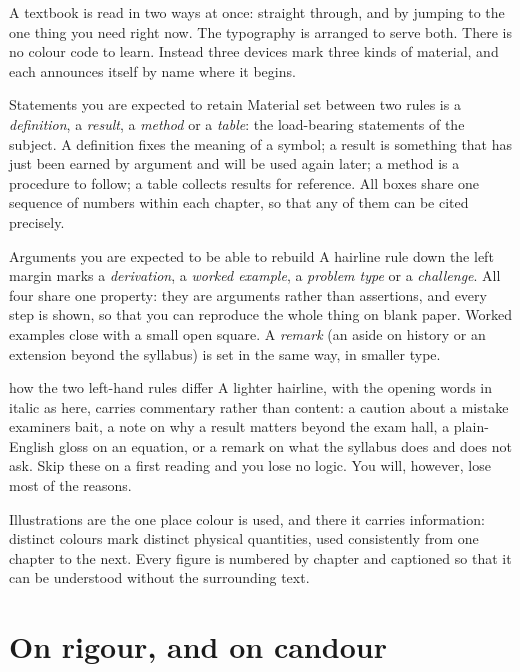 A textbook is read in two ways at once: straight through, and by jumping to the one thing you need
right now. The typography is arranged to serve both. There is no colour code to learn. Instead three
devices mark three kinds of material, and each announces itself by name where it begins.

\begin{defbox}{Statements you are expected to retain}
Material set between two rules is a \emph{definition}, a \emph{result}, a \emph{method} or a
\emph{table}: the load-bearing statements of the subject. A definition fixes the meaning of a symbol; a
result is something that has just been earned by argument and will be used again later; a method is a
procedure to follow; a table collects results for reference. All boxes share one sequence of numbers
within each chapter, so that any of them can be cited precisely.
\end{defbox}

\begin{derivbox}{Arguments you are expected to be able to rebuild}
A hairline rule down the left margin marks a \emph{derivation}, a \emph{worked example}, a
\emph{problem type} or a \emph{challenge}. All four share one property: they are arguments rather than
assertions, and every step is shown, so that you can reproduce the whole thing on blank paper. Worked
examples close with a small open square. A \emph{remark} (an aside on history or an extension beyond
the syllabus) is set in the same way, in smaller type.
\end{derivbox}

\begin{trapbox}{how the two left-hand rules differ}
A lighter hairline, with the opening words in italic as here, carries commentary rather than content:
a caution about a mistake examiners bait, a note on why a result matters beyond the exam hall, a
plain-English gloss on an equation, or a remark on what the syllabus does and does not ask. Skip these
on a first reading and you lose no logic. You will, however, lose most of the reasons.
\end{trapbox}

Illustrations are the one place colour is used, and there it carries information: distinct colours
mark distinct physical quantities, used consistently from one chapter to the next. Every figure is
numbered by chapter and captioned so that it can be understood without the surrounding text.

\endgroup

\section*{On rigour, and on candour}

